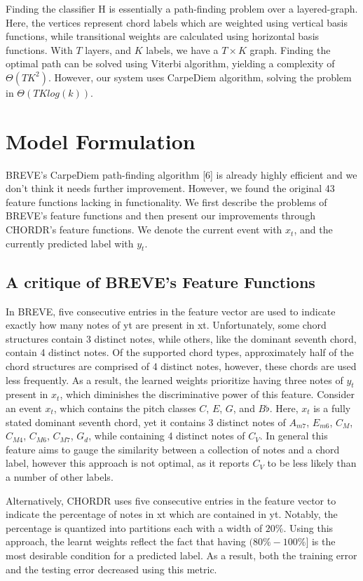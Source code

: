 \documentclass{article} %
\begin{document}
Finding the classifier H is essentially a path-finding problem over a layered-graph. Here, the vertices represent chord labels which are weighted using vertical basis functions, while transitional weights are calculated using horizontal basis functions. With $T$ layers, and $K$ labels, we have a $T \times K$ graph. Finding the optimal path can be solved using Viterbi algorithm, yielding a complexity of $\Theta(TK^2)$. However, our system uses CarpeDiem algorithm, solving the problem in $\Theta(TKlog(k))$.

\section{Model Formulation}

BREVE’s CarpeDiem path-finding algorithm [6] is already highly efficient and we don’t think it needs further improvement. However, we found the original 43 feature functions lacking in functionality. We first describe the problems of BREVE’s feature functions and then present our improvements through CHORDR’s feature functions. We denote the current event with $x_t$, and the currently predicted label with $y_t$.

\subsection{A critique of BREVE's Feature Functions}

In BREVE, five consecutive entries in the feature vector are used to indicate exactly how many notes of yt are present in xt. Unfortunately, some chord structures contain 3 distinct notes, while others, like the dominant seventh chord, contain 4 distinct notes. Of the supported chord types, approximately half of the chord structures are comprised of 4 distinct notes, however, these chords are used less frequently. As a result, the learned weights prioritize having three notes of $y_t$ present in $x_t$, which diminishes the discriminative power of this feature. Consider an event $x_t$, which contains the pitch classes $C$, $E$, $G$, and $B\flat$. Here, $x_t$ is a fully stated dominant seventh chord, yet it contains 3 distinct notes of $A_{m7}$, $E_{m6}$, $C_{M}$, $C_{M4}$, $C_{M6}$, $C_{M7}$, $G_{d}$, while containing 4 distinct notes of $C_V$. In general this feature aims to gauge the similarity between a collection of notes and a chord label, however this approach is not optimal, as it reports $C_V$ to be less likely than a number of other labels.

Alternatively, CHORDR uses five consecutive entries in the feature vector to indicate the percentage of notes in xt which are contained in yt. Notably, the percentage is quantized into partitions each with a width of $20\%$. Using this approach, the learnt weights reflect the fact that having $(80\% - 100\%]$ is the most desirable condition for a predicted label. As a result, both the training error and the testing error decreased using this metric.
\end{document}
